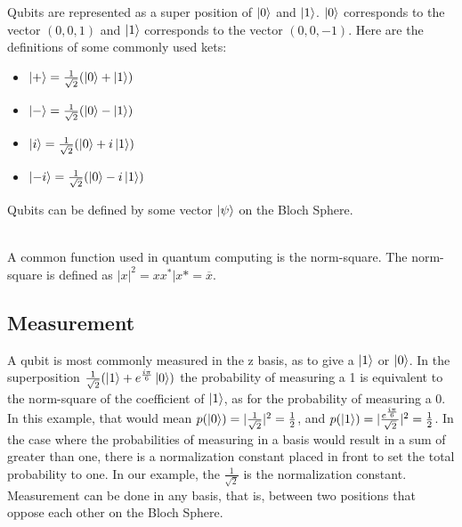 \documentclass{article}
\newcommand{\compconj}[1]{%
  \overline{#1}%
}
\begin{document}
Qubits are represented as a super position of $\ket{0}$ and $\ket{1}$. $\ket{0}$ corresponds to the vector $(0,0,1)$ and $\ket{1}$ corresponds to the vector $(0,0,-1)$. Here are the definitions of some commonly used kets:
\begin{itemize}
    \item $\ket{+}  = \frac{1}{\sqrt{2}}(\ket{0} + \ket{1})$
    \item $\ket{-}  = \frac{1}{\sqrt{2}}(\ket{0} - \ket{1})$
    \item $\ket{i}  = \frac{1}{\sqrt{2}}(\ket{0} + i\ket{1})$
    \item $\ket{-i} = \frac{1}{\sqrt{2}}(\ket{0} - i\ket{1})$
\end{itemize}
Qubits can be defined by some vector $\ket{\psi}$ on the Bloch Sphere.\\
\\ 
A common function used in quantum computing is the norm-square. The norm-square is defined as $|x|^2 = xx^* | x* = \compconj{x}$.

\subsection{Measurement}

A qubit is most commonly measured in the z basis, as to give a $\ket{1}$ or $\ket{0}$. In the superposition $\frac{1}{\sqrt{2}}(\ket{1}+e^{\frac{i\pi}{6}}\ket{0})$ the probability of measuring a 1 is equivalent to the norm-square of the coefficient of $\ket{1}$, as for the probability of measuring a 0. In this example, that would mean $p(\ket{0}) = |\frac{1}{\sqrt{2}}|^{2} = \frac{1}{2}$, and $p(\ket{1}) = |\frac{e^{\frac{i\pi}{6}}}{\sqrt{2}}|^{2} = \frac{1}{2}$. In the case where the probabilities of measuring in a basis would result in a sum of greater than one, there is a normalization constant placed in front to set the total probability to one. In our example, the $\frac{1}{\sqrt{2}}$ is the normalization constant. Measurement can be done in any basis, that is, between two positions that oppose each other on the Bloch Sphere. 
\end{document}
